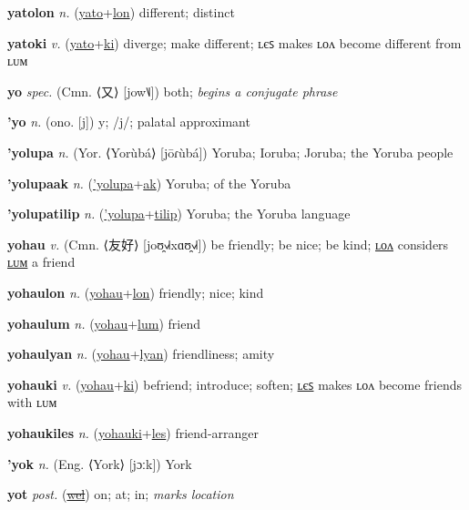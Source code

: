 \textbf{\hypertarget{yatolon}{yatolon}} \textit{n.} (\hyperlink{yato}{yato}+\allowbreak \hyperlink{lon}{lon})
different; distinct

\textbf{\hypertarget{yatoki}{yatoki}} \textit{v.} (\hyperlink{yato}{yato}+\allowbreak \hyperlink{ki}{ki})
diverge; make different; ʟєꜱ makes ʟᴏᴧ become different from ʟᴜᴍ

\textbf{\hypertarget{yo}{yo}} \textit{spec.} (Cmn. ⟨{\chinese{}又}⟩ [jow˥˩])
both; \textit{begins a conjugate phrase}

\textbf{\hypertarget{'yo}{'yo}} \textit{n.} (ono. [j])
y; /j/; palatal approximant

\textbf{\hypertarget{'yolupa}{'yolupa}} \textit{n.} (Yor. ⟨Yorùbá⟩ [jōɾùbá])
Yoruba; Ioruba; Joruba; the Yoruba people

\textbf{\hypertarget{'yolupaak}{'yolupaak}} \textit{n.} (\hyperlink{'yolupa}{'yolupa}+\allowbreak \hyperlink{ak}{ak})
Yoruba; of the Yoruba

\textbf{\hypertarget{'yolupatilip}{'yolupatilip}} \textit{n.} (\hyperlink{'yolupa}{'yolupa}+\allowbreak \hyperlink{tilip}{tilip})
Yoruba; the Yoruba language

\textbf{\hypertarget{yohau}{yohau}} \textit{v.} (Cmn. ⟨{\chinese{}友好}⟩ [joʊ̯˧˩˧xɑʊ̯˧˩˧])
be friendly; be nice; be kind; \hyperlink{yohaulon}{ʟᴏᴧ} considers \hyperlink{yohaulum}{ʟᴜᴍ} a friend

\textbf{\hypertarget{yohaulon}{yohaulon}} \textit{n.} (\hyperlink{yohau}{yohau}+\allowbreak \hyperlink{lon}{lon})
friendly; nice; kind

\textbf{\hypertarget{yohaulum}{yohaulum}} \textit{n.} (\hyperlink{yohau}{yohau}+\allowbreak \hyperlink{lum}{lum})
friend

\textbf{\hypertarget{yohaulyan}{yohaulyan}} \textit{n.} (\hyperlink{yohau}{yohau}+\allowbreak \hyperlink{lyan}{lyan})
friendliness; amity

\textbf{\hypertarget{yohauki}{yohauki}} \textit{v.} (\hyperlink{yohau}{yohau}+\allowbreak \hyperlink{ki}{ki})
befriend; introduce; soften; \hyperlink{yohaukiles}{ʟєꜱ} makes ʟᴏᴧ become friends with ʟᴜᴍ

\textbf{\hypertarget{yohaukiles}{yohaukiles}} \textit{n.} (\hyperlink{yohauki}{yohauki}+\allowbreak \hyperlink{les}{les})
friend-arranger

\textbf{\hypertarget{'yok}{'yok}} \textit{n.} (Eng. ⟨York⟩ [jɔːk])
York

\textbf{\hypertarget{yot}{yot}} \textit{post.} (\hyperlink{wel}{\sout{wel}})
on; at; in; \textit{marks location}

